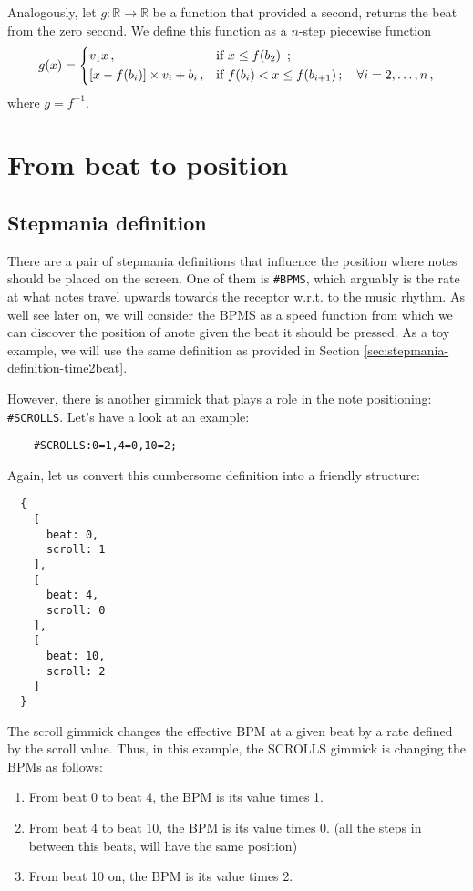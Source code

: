 \documentclass[a4paper,9pt]{article}
\begin{document}
    Analogously, let $ g: \mathbb{R} \rightarrow \mathbb{R} $ be a function that provided a second, returns the beat from the zero second. We define this function as a $n$-step piecewise function
    \begin{equation}
	    g(x) = \begin{dcases}
		    v_1x\,, & \text{if $x \leq f(b_{2}) $ }\,;\\
		    \left[x-f(b_{i})\right]\times v_i + b_{i}\,, & \text{if $f(b_{i}) < x \leq f(b_{i+1})\,;\quad \forall i=2,\ldots,n$}\,, \\
	    \end{dcases}
	    \label{eq:beat2second}
    \end{equation}
    where $g = f^{-1}$.

    \section{From beat to position}

    \subsection{Stepmania definition}

    There are a pair of stepmania definitions that influence the position where notes should be placed on the screen. One of them is \texttt{\#BPMS}, which arguably is the rate at what notes travel upwards towards the receptor w.r.t. to the music rhythm. As well see later on, we will consider the BPMS as a speed function from which we can discover the position of anote given the beat it should be pressed. As a toy example, we will use the same definition as provided in Section \ref{sec:stepmania-definition-time2beat}. 

    However, there is another gimmick that plays a role in the note positioning: \texttt{\#SCROLLS}. Let's have a look at an example:

    \begin{verbatim}
    #SCROLLS:0=1,4=0,10=2;     
    \end{verbatim}
    Again, let us convert this cumbersome definition into a friendly structure:
    \begin{verbatim}
  {
    [
      beat: 0,
      scroll: 1
    ],
    [
      beat: 4,
      scroll: 0 
    ],
    [
      beat: 10,
      scroll: 2 
    ]
  }
    \end{verbatim}
    The scroll gimmick changes the effective BPM at a given beat by a rate defined by the scroll value. Thus, in this example, the SCROLLS gimmick is changing the BPMs as follows:
    \begin{enumerate}
		\item From beat 0 to beat 4, the BPM is its value times 1.
		\item From beat 4 to beat 10, the BPM is its value times 0. (all the steps in between this beats, will have the same position)
		\item From beat 10 on, the BPM is its value times 2.
    \end{enumerate}
\end{document}
